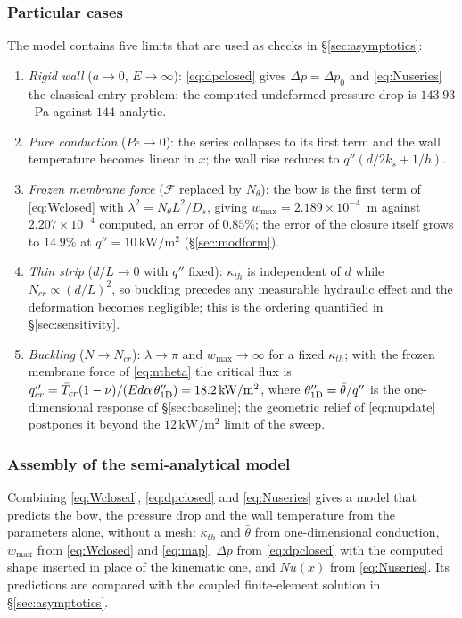 \documentclass[11pt,a4paper]{article}
\newcommand{\tabinput}[1]{%
  \IfFileExists{tables/#1}{}{}}
\begin{document}
\tabinput{table_thermal_path.tex}

\subsubsection{Particular cases}
\label{sec:cases}

The model contains five limits that are used as checks in \S\ref{sec:asymptotics}:

\begin{enumerate}
\item \emph{Rigid wall} ($a\to0$, $E\to\infty$): \eqref{eq:dpclosed} gives
$\Delta p=\Delta p_0$ and \eqref{eq:Nuseries} the classical entry problem; the computed
undeformed pressure drop is $143.93$~Pa against $144$ analytic.
\item \emph{Pure conduction} ($Pe\to0$): the series collapses to its first term and the wall
temperature becomes linear in $x$; the wall rise reduces to $q''(d/2k_s+1/h)$.
\item \emph{Frozen membrane force} ($\mathcal F$ replaced by $N_\theta$): the bow is the first
term of \eqref{eq:Wclosed} with $\lambda^2=N_\theta L^2/D_s$, giving
$w_{\max}=2.189\times10^{-4}$~m against $2.207\times10^{-4}$ computed, an error of
$0.85\%$; the error of the closure itself grows to $14.9\%$ at
$q''=10\,\mathrm{kW/m^2}$ (\S\ref{sec:modform}).
\item \emph{Thin strip} ($d/L\to0$ with $q''$ fixed): $\kappa_{th}$ is independent of $d$
while $N_{cr}\propto(d/L)^2$, so buckling precedes any measurable hydraulic effect and the
deformation becomes negligible; this is the ordering quantified in \S\ref{sec:sensitivity}.
\item \emph{Buckling} ($N\to N_{cr}$): $\lambda\to\pi$ and $w_{\max}\to\infty$ for a fixed
$\kappa_{th}$; with the frozen membrane force of \eqref{eq:ntheta} the critical flux is
$q''_{cr}=\bar T_{cr}(1-\nu)/(Ed\alpha\,\theta_{\rm 1D}'')=18.2\,\mathrm{kW/m^2}$, where
$\theta_{\rm 1D}''=\bar\theta/q''$ is the one-dimensional response of
\S\ref{sec:baseline}; the geometric relief of \eqref{eq:nupdate} postpones it beyond the
$12\,\mathrm{kW/m^2}$ limit of the sweep.
\end{enumerate}

\subsubsection{Assembly of the semi-analytical model}
\label{sec:assembly}

Combining \eqref{eq:Wclosed}, \eqref{eq:dpclosed} and \eqref{eq:Nuseries} gives a model that
predicts the bow, the pressure drop and the wall temperature from the parameters alone,
without a mesh: $\kappa_{th}$ and $\bar\theta$ from one-dimensional conduction, $w_{\max}$ from
\eqref{eq:Wclosed} and \eqref{eq:map}, $\Delta p$ from \eqref{eq:dpclosed} with the computed
shape inserted in place of the kinematic one, and $Nu(x)$ from \eqref{eq:Nuseries}. Its
predictions are compared with the coupled finite-element solution in \S\ref{sec:asymptotics}.
\end{document}
